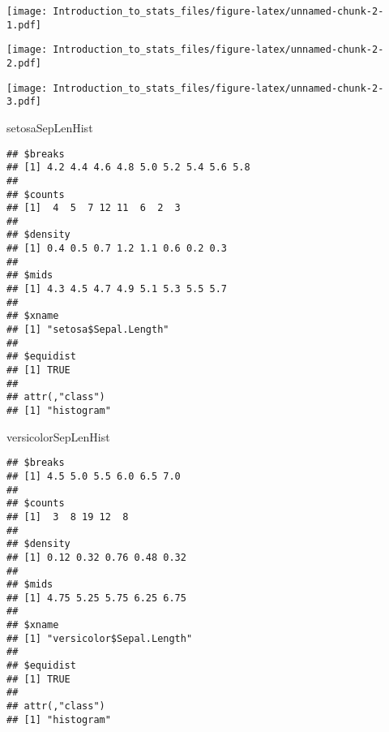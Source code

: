 \documentclass[
]{article}
\newenvironment{Shaded}{\begin{snugshade}}{\end{snugshade}}
\newcommand{\DataTypeTok}[1]{\textcolor[rgb]{0.13,0.29,0.53}{#1}}
\newcommand{\KeywordTok}[1]{\textcolor[rgb]{0.13,0.29,0.53}{\textbf{#1}}}
\newcommand{\NormalTok}[1]{#1}
\newcommand{\OperatorTok}[1]{\textcolor[rgb]{0.81,0.36,0.00}{\textbf{#1}}}
\newcommand{\StringTok}[1]{\textcolor[rgb]{0.31,0.60,0.02}{#1}}
\begin{document}
\texttt{[image: Introduction\_to\_stats\_files/figure-latex/unnamed-chunk-2-1.pdf]}

\begin{Shaded}
\end{Shaded}

\texttt{[image: Introduction\_to\_stats\_files/figure-latex/unnamed-chunk-2-2.pdf]}

\begin{Shaded}
\end{Shaded}

\texttt{[image: Introduction\_to\_stats\_files/figure-latex/unnamed-chunk-2-3.pdf]}

\begin{Shaded}
\begin{Highlighting}[]
\NormalTok{setosaSepLenHist}
\end{Highlighting}
\end{Shaded}

\begin{verbatim}
## $breaks
## [1] 4.2 4.4 4.6 4.8 5.0 5.2 5.4 5.6 5.8
## 
## $counts
## [1]  4  5  7 12 11  6  2  3
## 
## $density
## [1] 0.4 0.5 0.7 1.2 1.1 0.6 0.2 0.3
## 
## $mids
## [1] 4.3 4.5 4.7 4.9 5.1 5.3 5.5 5.7
## 
## $xname
## [1] "setosa$Sepal.Length"
## 
## $equidist
## [1] TRUE
## 
## attr(,"class")
## [1] "histogram"
\end{verbatim}

\begin{Shaded}
\begin{Highlighting}[]
\NormalTok{versicolorSepLenHist}
\end{Highlighting}
\end{Shaded}

\begin{verbatim}
## $breaks
## [1] 4.5 5.0 5.5 6.0 6.5 7.0
## 
## $counts
## [1]  3  8 19 12  8
## 
## $density
## [1] 0.12 0.32 0.76 0.48 0.32
## 
## $mids
## [1] 4.75 5.25 5.75 6.25 6.75
## 
## $xname
## [1] "versicolor$Sepal.Length"
## 
## $equidist
## [1] TRUE
## 
## attr(,"class")
## [1] "histogram"
\end{verbatim}
\end{document}
